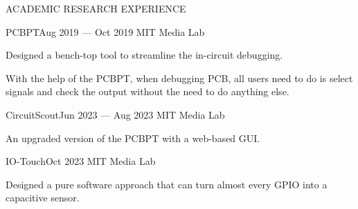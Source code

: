 \documentclass{resume} %
\begin{document}
\begin{rSection}{ACADEMIC RESEARCH EXPERIENCE}
\begin{rSubsection}{PCBPT}{Aug 2019 --- Oct 2019}{ }{MIT Media Lab}
\item Designed a bench-top tool to streamline the in-circuit debugging.
\item With the help of the PCBPT, when debugging PCB, all users need to do is select signals and check the output without the need to do anything else.
\end{rSubsection}

\begin{rSubsection}{CircuitScout}{Jun 2023 --- Aug 2023}{ }{MIT Media Lab}
\item An upgraded version of the PCBPT with a web-based GUI.
\end{rSubsection}

\begin{rSubsection}{IO-Touch}{Oct 2023}{ }{MIT Media Lab}
\item Designed a pure software approach that can turn almost every GPIO into a capacitive sensor.
\end{rSubsection}

\end{rSection}
\end{document}
